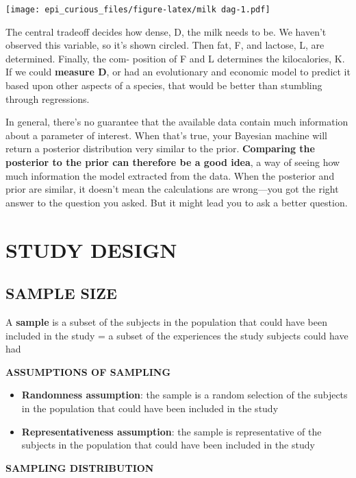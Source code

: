 \documentclass[
]{article}
\begin{document}
\texttt{[image: epi\_curious\_files/figure-latex/milk dag-1.pdf]}

The central tradeoff decides how dense, D, the milk needs to be. We
haven't observed this variable, so it's shown circled. Then fat, F, and
lactose, L, are determined. Finally, the com- position of F and L
determines the kilocalories, K. If we could \textbf{measure D}, or had
an evolutionary and economic model to predict it based upon other
aspects of a species, that would be better than stumbling through
regressions.

In general, there's no guarantee that the available data contain much
information about a parameter of interest. When that's true, your
Bayesian machine will return a posterior distribution very similar to
the prior. \textbf{Comparing the posterior to the prior can therefore be
a good idea}, a way of seeing how much information the model extracted
from the data. When the posterior and prior are similar, it doesn't mean
the calculations are wrong---you got the right answer to the question
you asked. But it might lead you to ask a better question.

\hypertarget{study-design}{%
\section{\texorpdfstring{\textbf{STUDY
DESIGN}}{STUDY DESIGN}}\label{study-design}}

\hypertarget{sample-size}{%
\subsection{SAMPLE SIZE}\label{sample-size}}

A \textbf{sample} is a subset of the subjects in the population that
could have been included in the study = a subset of the experiences the
study subjects could have had

\textbf{ASSUMPTIONS OF SAMPLING}

\begin{itemize}
\item
  \textbf{Randomness assumption}: the sample is a random selection of
  the subjects in the population that could have been included in the
  study
\item
  \textbf{Representativeness assumption}: the sample is representative
  of the subjects in the population that could have been included in the
  study
\end{itemize}

\textbf{SAMPLING DISTRIBUTION}
\end{document}
